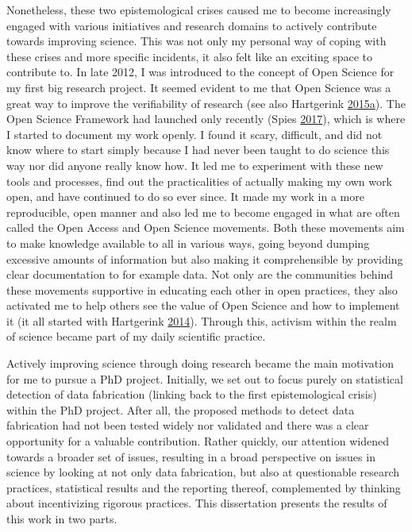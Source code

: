 \documentclass[a5paper]{book}
\begin{document}
Nonetheless, these two epistemological crises caused me to become
increasingly engaged with various initiatives and research domains to
actively contribute towards improving science. This was not only my
personal way of coping with these crises and more specific incidents, it
also felt like an exciting space to contribute to. In late 2012, I was
introduced to the concept of Open Science for my first big research
project. It seemed evident to me that Open Science was a great way to
improve the verifiability of research (see also Hartgerink
\protect\hyperlink{ref-doi:10.15200ux2fwinn.144232.26366}{2015}\protect\hyperlink{ref-doi:10.15200ux2fwinn.144232.26366}{a}).
The Open Science Framework had launched only recently (Spies
\protect\hyperlink{ref-doi:10.31237ux2fosf.ioux2ft23za}{2017}), which is
where I started to document my work openly. I found it scary, difficult,
and did not know where to start simply because I had never been taught
to do science this way nor did anyone really know how. It led me to
experiment with these new tools and processes, find out the
practicalities of actually making my own work open, and have continued
to do so ever since. It made my work in a more reproducible, open manner
and also led me to become engaged in what are often called the Open
Access and Open Science movements. Both these movements aim to make
knowledge available to all in various ways, going beyond dumping
excessive amounts of information but also making it comprehensible by
providing clear documentation to for example data. Not only are the
communities behind these movements supportive in educating each other in
open practices, they also activated me to help others see the value of
Open Science and how to implement it (it all started with Hartgerink
\protect\hyperlink{ref-doi:10.6084ux2fm9.figshare.928315.v2}{2014}).
Through this, activism within the realm of science became part of my
daily scientific practice.

Actively improving science through doing research became the main
motivation for me to pursue a PhD project. Initially, we set out to
focus purely on statistical detection of data fabrication (linking back
to the first epistemological crisis) within the PhD project. After all,
the proposed methods to detect data fabrication had not been tested
widely nor validated and there was a clear opportunity for a valuable
contribution. Rather quickly, our attention widened towards a broader
set of issues, resulting in a broad perspective on issues in science by
looking at not only data fabrication, but also at questionable research
practices, statistical results and the reporting thereof, complemented
by thinking about incentivizing rigorous practices. This dissertation
presents the results of this work in two parts.
\end{document}
